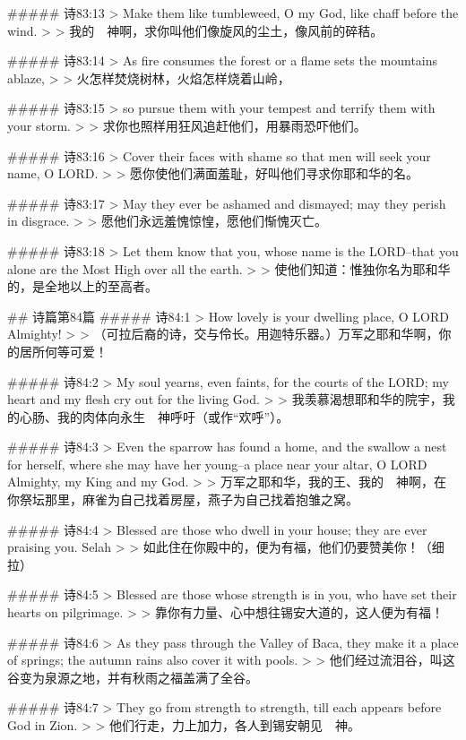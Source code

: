 ##### 诗83:13
> Make them like tumbleweed, O my God, like chaff before the wind.
>
> 我的　神啊，求你叫他们像旋风的尘土，像风前的碎秸。


##### 诗83:14
> As fire consumes the forest or a flame sets the mountains ablaze,
>
> 火怎样焚烧树林，火焰怎样烧着山岭，


##### 诗83:15
> so pursue them with your tempest and terrify them with your storm.
>
> 求你也照样用狂风追赶他们，用暴雨恐吓他们。


##### 诗83:16
> Cover their faces with shame so that men will seek your name, O LORD.
>
> 愿你使他们满面羞耻，好叫他们寻求你耶和华的名。


##### 诗83:17
> May they ever be ashamed and dismayed; may they perish in disgrace.
>
> 愿他们永远羞愧惊惶，愿他们惭愧灭亡。


##### 诗83:18
> Let them know that you, whose name is the LORD--that you alone are the Most High over all the earth.
>
> 使他们知道：惟独你名为耶和华的，是全地以上的至高者。


## 诗篇第84篇
##### 诗84:1
> How lovely is your dwelling place, O LORD Almighty!
>
> （可拉后裔的诗，交与伶长。用迦特乐器。）万军之耶和华啊，你的居所何等可爱！


##### 诗84:2
> My soul yearns, even faints, for the courts of the LORD; my heart and my flesh cry out for the living God.
>
> 我羡慕渴想耶和华的院宇，我的心肠、我的肉体向永生　神呼吁（或作“欢呼”）。


##### 诗84:3
> Even the sparrow has found a home, and the swallow a nest for herself, where she may have her young--a place near your altar, O LORD Almighty, my King and my God.
>
> 万军之耶和华，我的王、我的　神啊，在你祭坛那里，麻雀为自己找着房屋，燕子为自己找着抱雏之窝。


##### 诗84:4
> Blessed are those who dwell in your house; they are ever praising you. Selah
>
> 如此住在你殿中的，便为有福，他们仍要赞美你！（细拉）


##### 诗84:5
> Blessed are those whose strength is in you, who have set their hearts on pilgrimage.
>
> 靠你有力量、心中想往锡安大道的，这人便为有福！


##### 诗84:6
> As they pass through the Valley of Baca, they make it a place of springs; the autumn rains also cover it with pools.
>
> 他们经过流泪谷，叫这谷变为泉源之地，并有秋雨之福盖满了全谷。


##### 诗84:7
> They go from strength to strength, till each appears before God in Zion.
>
> 他们行走，力上加力，各人到锡安朝见　神。


